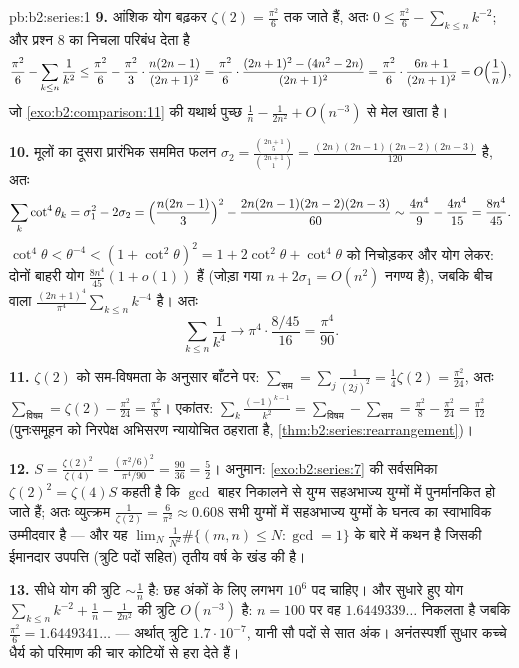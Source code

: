 \begin{solution}{pb:b2:series:1}
\textbf{9.} आंशिक योग बढ़कर $\zeta(2) =
\frac{\pi^2}6$ तक जाते हैं, अतः $0 \leq \frac{\pi^2}6 - \sum_{k\leq n}k^{-2}$; और प्रश्न 8 का
निचला परिबंध देता है
\[
\frac{\pi^2}6 - \sum_{k\leq n}\frac1{k^2}
\leq \frac{\pi^2}6 - \frac{\pi^2}3\cdot\frac{n(2n-1)}{(2n+1)^2}
= \frac{\pi^2}6\cdot\frac{(2n+1)^2 - (4n^2 -
2n)}{(2n+1)^2}
= \frac{\pi^2}6\cdot\frac{6n + 1}{(2n+1)^2}
= O\Bigl(\frac1n\Bigr),
\]
जो \cref{exo:b2:comparison:11} की यथार्थ पुच्छ $\frac1n - \frac1{2n^2} + O(n^{-3})$ से मेल खाता है।

\textbf{10.} मूलों का दूसरा प्रारंभिक सममित फलन $\sigma_2 = \frac{\binom{2n+1}5}{\binom{2n+1}1} =
\frac{(2n)(2n-1)(2n-2)(2n-3)}{120}$ है, अतः
\[
\sum_k\cot^4\theta_k = \sigma_1^2 - 2\sigma_2
= \Bigl(\frac{n(2n-1)}3\Bigr)^2 -
\frac{2n(2n-1)(2n-2)(2n-3)}{60}
\sim \frac{4n^4}9 - \frac{4n^4}{15} = \frac{8n^4}{45}.
\]
$\cot^4\theta < \theta^{-4} < (1 + \cot^2\theta)^2 =
1 + 2\cot^2\theta + \cot^4\theta$ को निचोड़कर और योग लेकर: दोनों बाहरी योग $\frac{8n^4}{45}(1 + o(1))$ हैं (जोड़ा गया $n + 2\sigma_1 =
O(n^2)$
नगण्य है), जबकि बीच वाला $\frac{(2n+1)^4}{\pi^4}\sum_{k\leq n}k^{-4}$ है। अतः
\[
\sum_{k\leq n}\frac1{k^4} \longrightarrow
\pi^4\cdot\frac{8/45}{16} = \frac{\pi^4}{90}.
\]

\textbf{11.} $\zeta(2)$ को सम-विषमता के अनुसार बाँटने पर: $\sum_{\text{सम}}
= \sum_j\frac{1}{(2j)^2} = \frac14\zeta(2) = \frac{\pi^2}{24}$,
अतः $\sum_{\text{विषम}} = \zeta(2) - \frac{\pi^2}{24} =
\frac{\pi^2}8$। एकांतर: $\sum_k\frac{(-1)^{k-1}}{k^2} =
\sum_{\text{विषम}} - \sum_{\text{सम}} = \frac{\pi^2}8 -
\frac{\pi^2}{24} = \frac{\pi^2}{12}$
(पुनःसमूहन को निरपेक्ष अभिसरण न्यायोचित ठहराता है, \cref{thm:b2:series:rearrangement})।

\textbf{12.} $S = \frac{\zeta(2)^2}{\zeta(4)} =
\frac{(\pi^2/6)^2}{\pi^4/90} = \frac{90}{36} = \frac52$। अनुमान: \cref{exo:b2:series:7} की सर्वसमिका $\zeta(2)^2 = \zeta(4)S$ कहती है कि $\gcd$ बाहर
निकालने से युग्म सहअभाज्य युग्मों में पुनर्मानकित हो जाते हैं; अतः
व्युत्क्रम $\frac1{\zeta(2)} = \frac6{\pi^2} \approx 0.608$ सभी युग्मों में सहअभाज्य युग्मों के घनत्व का स्वाभाविक
उम्मीदवार है --- और यह $\lim_N \frac{1}{N^2}\#\{(m,n) \leq N :
\gcd = 1\}$ के बारे में कथन है जिसकी ईमानदार उपपत्ति
(त्रुटि पदों सहित) तृतीय वर्ष के खंड की है।

\textbf{13.} सीधे योग की त्रुटि $\sim \frac1n$ है: छह अंकों के लिए लगभग $10^6$ पद
चाहिए। और सुधारे हुए योग $\sum_{k\leq n}k^{-2} + \frac1n - \frac1{2n^2}$ की त्रुटि $O(n^{-3})$ है: $n = 100$ पर वह $1.6449339\dots$ निकलता है
जबकि $\frac{\pi^2}6 = 1.6449341\dots$ --- अर्थात् त्रुटि $1.7\cdot10^{-7}$, यानी सौ पदों से सात अंक। अनंतस्पर्शी
सुधार कच्चे धैर्य को परिमाण की चार कोटियों से हरा देते हैं।


\end{solution}
